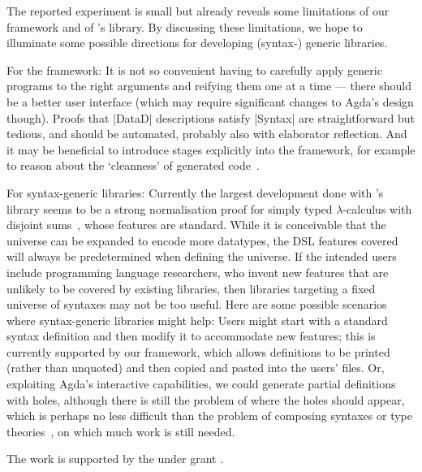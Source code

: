 \documentclass[sigplan,review,fleqn]{acmart}
\renewcommand{\verb}{\collectverb{\color{AgdaFunction}}}
\begin{document}

The reported experiment is small but already reveals some limitations of our framework and of \citeauthor{Allais-generic-syntax}'s library.
By discussing these limitations, we hope to illuminate some possible directions for developing (syntax-) generic libraries.

For the framework:
It is not so convenient having to carefully apply generic programs to the right arguments and reifying them one at a time --- there should be a better user interface (which may require significant changes to Agda's design though).
Proofs that \verb|DataD| descriptions satisfy \verb|Syntax| are straightforward but tedious, and should be automated, probably also with elaborator reflection.
And it may be beneficial to introduce stages explicitly into the framework, for example to reason about the `cleanness' of generated code~\citep[Section~4.1]{Pickering-staged-SoP}.

For syntax-generic libraries:
Currently the largest development done with \citeauthor{Allais-generic-syntax}'s library seems to be a strong normalisation proof for simply typed $\lambda$-calculus with disjoint sums~\citep[Section~4.3]{Abel-POPLMark-reloaded}, whose features are standard.
While it is conceivable that the universe can be expanded to encode more datatypes, the DSL features covered will always be predetermined when defining the universe.
If the intended users include programming language researchers, who invent new features that are unlikely to be covered by existing libraries, then libraries targeting a fixed universe of syntaxes may not be too useful.
Here are some possible scenarios where syntax-generic libraries might help:
Users might start with a standard syntax definition and then modify it to accommodate new features; this is currently supported by our framework, which allows definitions to be printed (rather than unquoted) and then copied and pasted into the users' files.
Or, exploiting Agda's interactive capabilities, we could generate partial definitions with holes,  although there is still the problem of where the holes should appear, which is perhaps no less difficult than the problem of composing syntaxes or type theories~\citep{Delaware-meta-theory-a-la-carte,Forster-Coq-a-la-carte}, on which much work is still needed.

\begin{acks}
The work is supported by the  under grant .
\end{acks}



%
\end{document}
